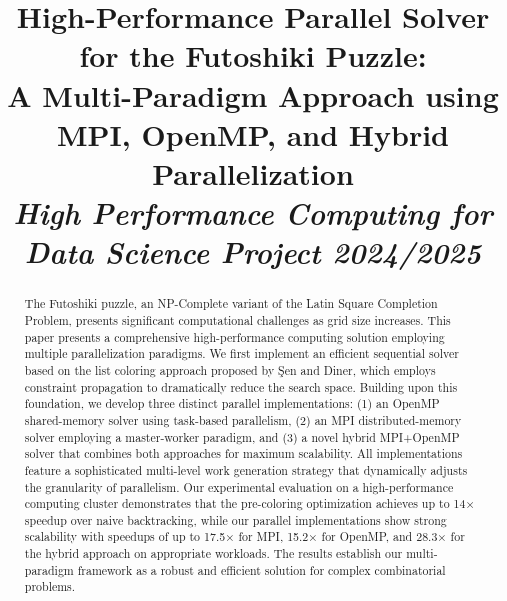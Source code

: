 \documentclass[10pt, conference]{IEEEtran}
\begin{document}


\title{High-Performance Parallel Solver for the Futoshiki Puzzle:\\
A Multi-Paradigm Approach using MPI, OpenMP, and Hybrid Parallelization\\
\normalsize \textit{High Performance Computing for Data Science Project 2024/2025}
}

\author{
\and
{}
\and
{}
}

\maketitle

\begin{abstract}
The Futoshiki puzzle, an NP-Complete variant of the Latin Square Completion Problem, presents significant computational challenges as grid size increases. This paper presents a comprehensive high-performance computing solution employing multiple parallelization paradigms. We first implement an efficient sequential solver based on the list coloring approach proposed by Şen and Diner, which employs constraint propagation to dramatically reduce the search space. Building upon this foundation, we develop three distinct parallel implementations: (1) an OpenMP shared-memory solver using task-based parallelism, (2) an MPI distributed-memory solver employing a master-worker paradigm, and (3) a novel hybrid MPI+OpenMP solver that combines both approaches for maximum scalability. All implementations feature a sophisticated multi-level work generation strategy that dynamically adjusts the granularity of parallelism. Our experimental evaluation on a high-performance computing cluster demonstrates that the pre-coloring optimization achieves up to 14× speedup over naive backtracking, while our parallel implementations show strong scalability with speedups of up to 17.5× for MPI, 15.2× for OpenMP, and 28.3× for the hybrid approach on appropriate workloads. The results establish our multi-paradigm framework as a robust and efficient solution for complex combinatorial problems.
\end{abstract}
\end{document}
